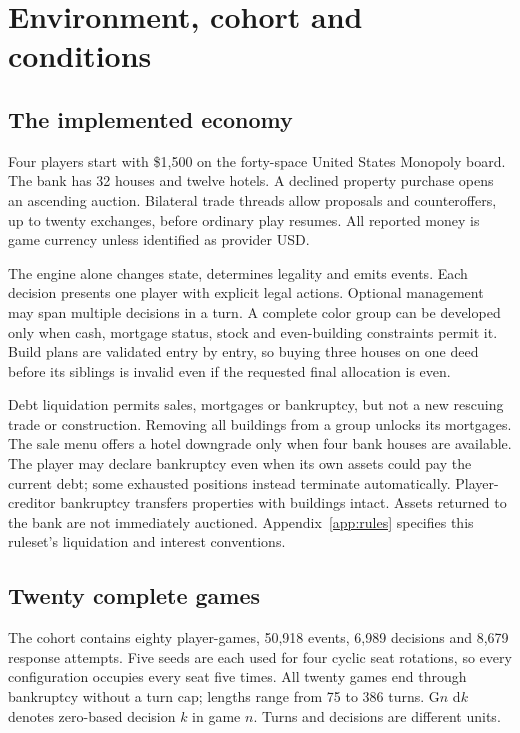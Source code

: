 \section{Environment, cohort and conditions}
\label{sec:setup}

\subsection{The implemented economy}

Four players start with \$1,500 on the forty-space United States Monopoly board. The bank has 32 houses and twelve hotels. A declined property purchase opens an ascending auction. Bilateral trade threads allow proposals and counteroffers, up to twenty exchanges, before ordinary play resumes. All reported money is game currency unless identified as provider USD.

The engine alone changes state, determines legality and emits events. Each decision presents one player with explicit legal actions. Optional management may span multiple decisions in a turn. A complete color group can be developed only when cash, mortgage status, stock and even-building constraints permit it. Build plans are validated entry by entry, so buying three houses on one deed before its siblings is invalid even if the requested final allocation is even.

Debt liquidation permits sales, mortgages or bankruptcy, but not a new rescuing trade or construction. Removing all buildings from a group unlocks its mortgages. The sale menu offers a hotel downgrade only when four bank houses are available. The player may declare bankruptcy even when its own assets could pay the current debt; some exhausted positions instead terminate automatically. Player-creditor bankruptcy transfers properties with buildings intact. Assets returned to the bank are not immediately auctioned. Appendix~\ref{app:rules} specifies this ruleset's liquidation and interest conventions.

\subsection{Twenty complete games}

The cohort contains eighty player-games, 50,918 events, 6,989 decisions and 8,679 response attempts. Five seeds are each used for four cyclic seat rotations, so every configuration occupies every seat five times. All twenty games end through bankruptcy without a turn cap; lengths range from 75 to 386 turns. G$n$ d$k$ denotes zero-based decision $k$ in game $n$. Turns and decisions are different units.

